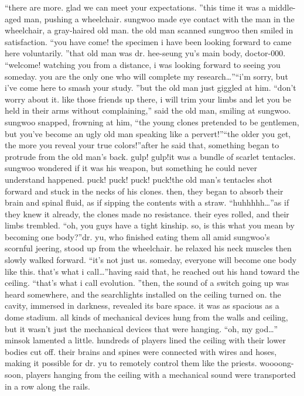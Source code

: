 “there are more.
 glad we can meet your expectations.
”this time it was a middle-aged man, pushing a wheelchair.
sungwoo made eye contact with the man in the wheelchair, a gray-haired old man.
the old man scanned sungwoo then smiled in satisfaction.
“you have come! the specimen i have been looking forward to came here voluntarily.
”that old man was dr.
 hee-seung yu’s main body, doctor-000.
“welcome! watching you from a distance, i was looking forward to seeing you someday.
 you are the only one who will complete my research…”“i’m sorry, but i’ve come here to smash your study.
”but the old man just giggled at him.
“don’t worry about it.
 like those friends up there, i will trim your limbs and let you be held in their arms without complaining,” said the old man, smiling at sungwoo.
sungwoo snapped, frowning at him, “the young clones pretended to be gentlemen, but you’ve become an ugly old man speaking like a pervert!”“the older you get, the more you reveal your true colors!”after he said that, something began to protrude from the old man’s back.
gulp! gulp!it was a bundle of scarlet tentacles.
 sungwoo wondered if it was his weapon, but something he could never understand happened.
puck! puck! puck! puck!the old man’s tentacles shot forward and stuck in the necks of his clones.
then, they began to absorb their brain and spinal fluid, as if sipping the contents with a straw.
“huhhhhh…”as if they knew it already, the clones made no resistance.
 their eyes rolled, and their limbs trembled.
“oh, you guys have a tight kinship.
 so, is this what you mean by becoming one body?”dr.
 yu, who finished eating them all amid sungwoo’s scornful jeering, stood up from the wheelchair.
 he relaxed his neck muscles then slowly walked forward.
“it’s not just us.
 someday, everyone will become one body like this.
 that’s what i call…”having said that, he reached out his hand toward the ceiling.
“that’s what i call evolution.
”then, the sound of a switch going up was heard somewhere, and the searchlights installed on the ceiling turned on.
 the cavity, immersed in darkness, revealed its bare space.
it was as spacious as a dome stadium.
 all kinds of mechanical devices hung from the walls and ceiling, but it wasn’t just the mechanical devices that were hanging.
“oh, my god…” minsok lamented a little.
hundreds of players lined the ceiling with their lower bodies cut off.
their brains and spines were connected with wires and hoses, making it possible for dr.
 yu to remotely control them like the priests.
woooong-soon, players hanging from the ceiling with a mechanical sound were transported in a row along the rails.
